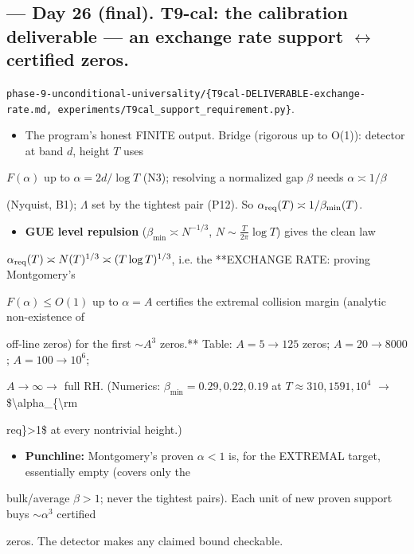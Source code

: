 \documentclass[10pt]{article}
\begin{document}
\subsection*{ --- Day 26 (final). T9-cal: the calibration deliverable --- an exchange rate support \ensuremath{\leftrightarrow} certified zeros.}
\texttt{phase-9-unconditional-universality/\{T9cal-DELIVERABLE-exchange-rate.md, experiments/T9cal\_support\_requirement.py\}}.\par
\begin{itemize}
\item The program's honest FINITE output. Bridge (rigorous up to O(1)): detector at band $d$, height $T$ uses
\end{itemize}
  $F(\alpha)$ up to $\alpha=2d/\log T$ (N3); resolving a normalized gap $\beta$ needs $\alpha\asymp1/\beta$\par
  (Nyquist, B1); $\Lambda$ set by the tightest pair (P12). So $\alpha_{\rm req}(T)\asymp1/\beta_{\min}(T)$.\par
\begin{itemize}
\item \textbf{GUE level repulsion} ($\beta_{\min}\asymp N^{-1/3}$, $N\sim\frac{T}{2\pi}\log T$) gives the clean law
\end{itemize}
  $\alpha_{\rm req}(T)\asymp N(T)^{1/3}\asymp(T\log T)^{1/3}$, i.e. the **EXCHANGE RATE: proving Montgomery's\par
  $F(\alpha)\le O(1)$ up to $\alpha=A$ certifies the extremal collision margin (analytic non-existence of\par
  off-line zeros) for the first $\sim A^3$ zeros.** Table: $A{=}5\to125$ zeros; $A{=}20\to8000$; $A{=}100\to10^6$;\par
  $A{\to}\infty\to$ full RH. (Numerics: $\beta_{\min}=0.29,0.22,0.19$ at $T\approx310,1591,10^4$ \ensuremath{\to} \$\textbackslash{}alpha\_\{\textbackslash{}rm\par
  req\}>1\$ at every nontrivial height.)\par
\begin{itemize}
\item \textbf{Punchline:} Montgomery's proven $\alpha<1$ is, for the EXTREMAL target, essentially empty (covers only the
\end{itemize}
  bulk/average $\beta>1$; never the tightest pairs). Each unit of new proven support buys $\sim\alpha^3$ certified\par
  zeros. The detector makes any claimed bound checkable.\par
\end{document}
